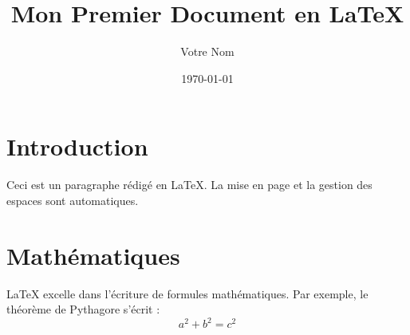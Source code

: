 \documentclass[11pt, a4paper]{article}
\title{Mon Premier Document en LaTeX}
\author{Votre Nom}
\date{\today}
\begin{document}
\maketitle

\section{Introduction}
Ceci est un paragraphe rédigé en LaTeX. La mise en page et la gestion des espaces sont automatiques.

\section{Mathématiques}
LaTeX excelle dans l'écriture de formules mathématiques. Par exemple, le théorème de Pythagore s'écrit :
\begin{equation}
    a^2 + b^2 = c^2
\end{equation}
\end{document}
